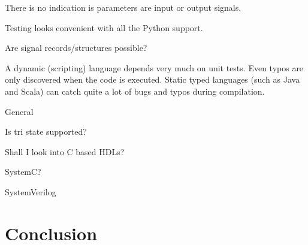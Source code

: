 \documentclass[10pt, conference, compsocconf]{IEEEtran}
\begin{document}
There is no indication is parameters are input or output signals.

Testing looks convenient with all the Python support.

Are signal records/structures possible?

A dynamic (scripting) language depends very much on unit tests. Even typos are only
discovered when the code is executed. Static typed languages (such as Java
and Scala) can catch quite a lot of bugs and typos during compilation.

General

Is tri state supported?

Shall I look into C based HDLs?

SystemC?

SystemVerilog

\section{Conclusion}
\label{sec:conclusion}





\end{document}

